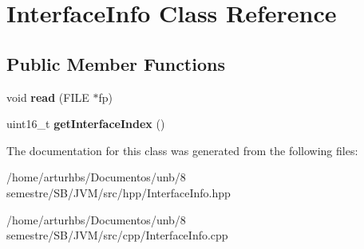 \hypertarget{classInterfaceInfo}{}\section{Interface\+Info Class Reference}
\label{classInterfaceInfo}
\subsection*{Public Member Functions}
\begin{DoxyCompactItemize}
\item 
void {\bfseries read} (F\+I\+LE $\ast$fp)\hypertarget{classInterfaceInfo_aa26a7efe110f489c3b3c07e0929e1fb1}{}\label{classInterfaceInfo_aa26a7efe110f489c3b3c07e0929e1fb1}

\item 
uint16\+\_\+t {\bfseries get\+Interface\+Index} ()\hypertarget{classInterfaceInfo_af7ab62416f54dc3b2a74a21f4d16d812}{}\label{classInterfaceInfo_af7ab62416f54dc3b2a74a21f4d16d812}

\end{DoxyCompactItemize}


The documentation for this class was generated from the following files\+:\begin{DoxyCompactItemize}
\item 
/home/arturhbs/\+Documentos/unb/8 semestre/\+S\+B/\+J\+V\+M/src/hpp/Interface\+Info.\+hpp\item 
/home/arturhbs/\+Documentos/unb/8 semestre/\+S\+B/\+J\+V\+M/src/cpp/Interface\+Info.\+cpp\end{DoxyCompactItemize}
